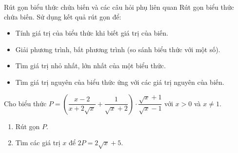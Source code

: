 \begin{dang}{Rút gọn biểu thức chứa biến và các câu hỏi phụ liên quan}
	Rút gọn biểu thức chứa biến. Sử dụng kết quả rút gọn để:
	\begin{itemize}
		\item Tính giá trị của biểu thức khi biết giá trị của biến.
		\item Giải phương trình, bất phương trình (so sánh biểu thức với một số).
		\item Tìm giá trị nhỏ nhất, lớn nhất của một biểu thức.
		\item Tìm giá trị nguyên của biểu thức ứng với các giá trị nguyên của biến.
	\end{itemize}
	\end{dang}
\begin{vd}
 Cho biểu thức $P = \left( {\dfrac{{x - 2}}{{x + 2\sqrt x }} + \dfrac{1}{{\sqrt x  + 2}}} \right)\cdot \dfrac{{\sqrt x  + 1}}{{\sqrt x  - 1}}$ với $ x > 0 $ và $ x \ne 1.$
		\begin{enumerate}
			\item Rút gọn $ P $.
			\item Tìm các giá trị $ x $ để $ 2P = 2\sqrt{x} + 5 .$
			\end{enumerate}
	
\end{vd}
